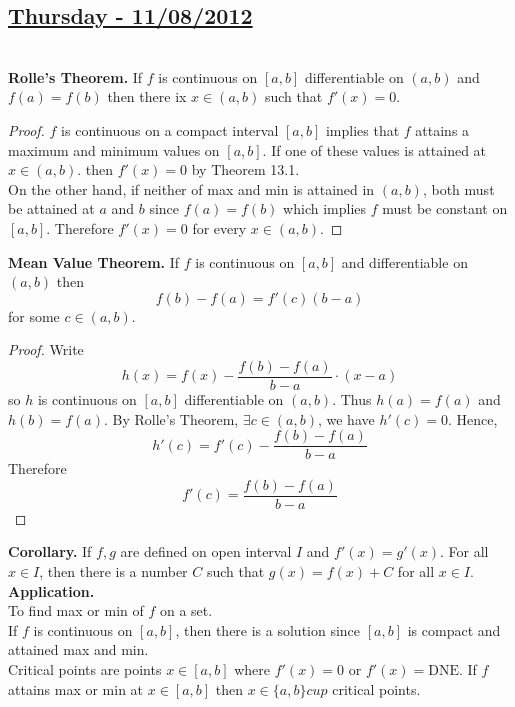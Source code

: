 \documentclass[10pt,letterpaper]{article}
\begin{document}
	\subsection*{{\color{red}\underline{Thursday - 11/08/2012}}}
	\text{ } \\
	
	\textbf{Rolle's Theorem. } If $f$ is continuous on $[a, b]$ differentiable on $(a, b)$ and
	$f(a) = f(b)$ then there ix $x \in (a, b)$ such that $f'(x) = 0$.
	\begin{proof}
		$f$ is continuous on a compact interval $[a, b]$ implies that $f$ attains a maximum and
		minimum values on $[a, b]$. If one of these values is attained at $x \in (a, b)$. then
		$f'(x) = 0$ by Theorem 13.1. \\
		On the other hand, if neither of max and min is attained in $(a, b)$, both must be 
		attained at $a$ and $b$ since $f(a) = f(b)$ which implies $f$ must be constant on $[a, b]$.
		Therefore $f'(x) = 0$ for every $x \in (a, b)$.
	\end{proof}
	
	\textbf{Mean Value Theorem. } If $f$ is continuous on $[a, b]$ and differentiable on $(a, b)$
	then 
	$$f(b) - f(a) = f'(c)(b - a)$$
	for some $c \in (a, b)$.
	\begin{proof}
	Write $$h(x) = f(x) - \dfrac{f(b) - f(a)}{b - a} \cdot (x - a)$$
	so $h$ is continuous on $[a, b]$ differentiable on $(a, b)$. Thus $h(a) = f(a)$ and $h(b) = f(a)$.
	By Rolle's Theorem, $\exists c \in (a, b)$, we have $h'(c) = 0$. Hence,
	$$h'(c) = f'(c) - \dfrac{f(b) - f(a)}{b - a}$$
	Therefore $$f'(c) = \dfrac{f(b) - f(a)}{b - a}$$
	\end{proof}
	
	\textbf{Corollary. } If $f, g$ are defined on open interval $I$ and $f'(x) = g'(x)$. For all
	$x \in I$, then there is a number $C$ such that $g(x) = f(x) + C$ for all $x \in I$. \\
	
	\textbf{Application. } \\
	To find max or min of $f$ on a set. \\ 
	If $f$ is continuous on $[a, b]$, then there is
	a solution since $[a, b]$ is compact and attained max and min. \\
	Critical points are points $x \in [a, b]$ where $f'(x) = 0$ or $f'(x) = \text{DNE}$.
	If $f$ attains max or min at $x \in [a, b]$ then $x \in \{a, b\} cup $ critical points. \\
	
\end{document}
